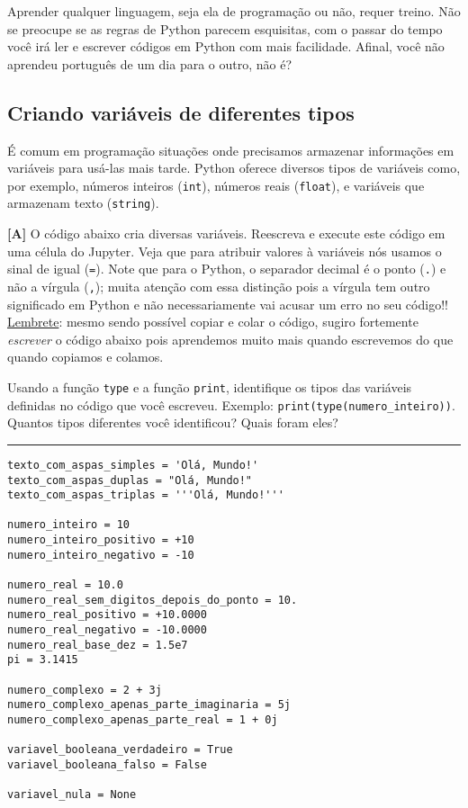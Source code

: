 \documentclass[11pt]{article}
\begin{document}
Aprender qualquer linguagem, seja ela de programação ou não, requer treino. Não se preocupe se as regras de Python parecem esquisitas, com o passar do tempo você irá ler e escrever códigos em Python com mais facilidade. Afinal, você não aprendeu português de um dia para o outro, não é?

\subsection{Criando variáveis de diferentes tipos}
\label{sec:orgaed9b04}

É comum em programação situações onde precisamos armazenar informações em variáveis para usá-las mais tarde. Python oferece diversos tipos de variáveis como, por exemplo, números inteiros (\texttt{int}), números reais (\texttt{float}), e variáveis que armazenam texto (\texttt{string}).

\textbf{[A]} O código abaixo cria diversas variáveis. Reescreva e execute este código em uma célula do Jupyter. Veja que para atribuir valores à variáveis nós usamos o sinal de igual (\texttt{=}). Note que para o Python, o separador decimal é o ponto (\texttt{.}) e não a vírgula (\texttt{,}); muita atenção com essa distinção pois a vírgula tem outro significado em Python e não necessariamente vai acusar um erro no seu código!! \uline{Lembrete}: mesmo sendo possível copiar e colar o código, sugiro fortemente \emph{escrever} o código abaixo pois aprendemos muito mais quando escrevemos do que quando copiamos e colamos.

Usando a função \texttt{type} e a função \texttt{print}, identifique os tipos das variáveis definidas no código que você escreveu. Exemplo: \texttt{print(type(numero\_inteiro))}. Quantos tipos diferentes você identificou? Quais foram eles?

\par\noindent\rule{\textwidth}{0.4pt}
\begin{verbatim}
texto_com_aspas_simples = 'Olá, Mundo!'
texto_com_aspas_duplas = "Olá, Mundo!"
texto_com_aspas_triplas = '''Olá, Mundo!'''

numero_inteiro = 10
numero_inteiro_positivo = +10
numero_inteiro_negativo = -10

numero_real = 10.0
numero_real_sem_digitos_depois_do_ponto = 10.
numero_real_positivo = +10.0000
numero_real_negativo = -10.0000
numero_real_base_dez = 1.5e7
pi = 3.1415

numero_complexo = 2 + 3j
numero_complexo_apenas_parte_imaginaria = 5j
numero_complexo_apenas_parte_real = 1 + 0j

variavel_booleana_verdadeiro = True
variavel_booleana_falso = False

variavel_nula = None
\end{verbatim}
\end{document}
